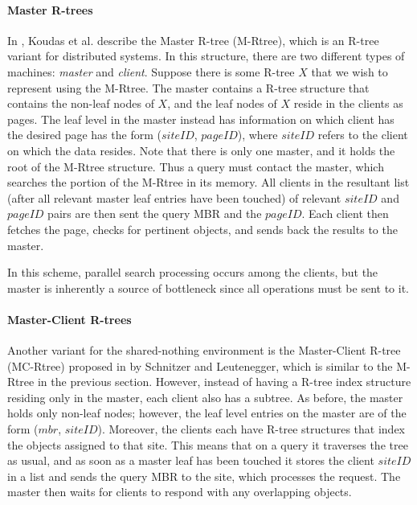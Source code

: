 \paragraph{Master R-trees}
In \cite{koudas1996declustering}, Koudas et al. describe the  Master R-tree 
(M-Rtree), which is an R-tree variant for distributed systems.
In this structure, there are two different types of machines: \emph{master} and 
\emph{client}. Suppose there is some R-tree $X$ that we wish to represent using 
the M-Rtree. The master contains a R-tree structure that contains the non-leaf 
nodes of $X$, and the leaf nodes of $X$ reside in the clients as pages. The leaf 
level in the master instead has information on which client has the desired page 
has the form ($siteID$, $pageID$), where $siteID$ refers to the client on which
the data resides. Note that there is only one master, and it holds the root of 
the M-Rtree structure.
Thus a query must contact the master, which searches the portion of the M-Rtree 
in its memory. All clients in the resultant list (after all relevant master leaf 
entries have been touched) of relevant $siteID$ and $pageID$ pairs are then sent 
the query MBR and the $pageID$. Each client then fetches the page, checks for 
pertinent objects, and sends back the results to the master. 

In this scheme, parallel search processing occurs among the clients, but the 
master is inherently a source of bottleneck since all operations must be sent to
it.

\paragraph{Master-Client R-trees}
Another variant for the shared-nothing environment is the Master-Client R-tree 
(MC-Rtree) proposed in \cite{schnitzer1999master} by Schnitzer and Leutenegger,  
which is similar to the 
M-Rtree in the previous section. However, instead of having a R-tree index 
structure residing only in the master, each client also has a subtree. As before,
the master holds only non-leaf nodes; however, the leaf level entries on the 
master are of the form ($mbr$, $siteID$). Moreover, the clients each have R-tree
structures that index the objects assigned to that site. This means that on a 
query it traverses the tree as usual, and as soon as a master leaf has been 
touched it stores the client $siteID$ in a list and sends the query MBR to the 
site, which processes the request. The master then waits for clients to respond
with any overlapping objects. 

